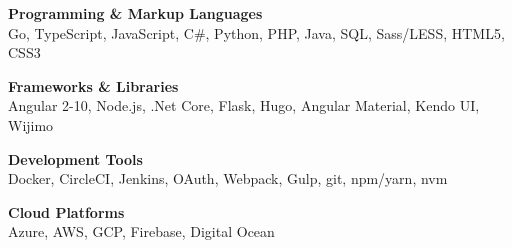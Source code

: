 

\begin{cvparagraph}

    \textbf{Programming \& Markup Languages}\\
    Go, TypeScript, JavaScript, C\#, Python, PHP, Java, SQL, Sass/LESS, HTML5, CSS3

    \textbf{Frameworks \& Libraries}\\
    Angular 2-10, Node.js, .Net Core, Flask, Hugo, Angular Material, Kendo UI, Wijimo

    \textbf{Development Tools}\\
    Docker, CircleCI, Jenkins, OAuth, Webpack, Gulp, git, npm/yarn, nvm

    \textbf{Cloud Platforms}\\
    Azure, AWS, GCP, Firebase, Digital Ocean
\end{cvparagraph}
